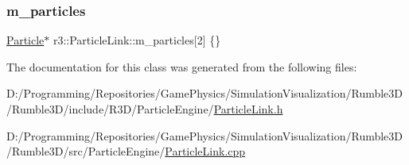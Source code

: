 \subsubsection{\texorpdfstring{m\+\_\+particles}{m\_particles}}
{\footnotesize\ttfamily \mbox{\hyperlink{classr3_1_1_particle}{Particle}}$\ast$ r3\+::\+Particle\+Link\+::m\+\_\+particles\mbox{[}2\mbox{]} \{\}\hspace{0.3cm}{\ttfamily [protected]}}



The documentation for this class was generated from the following files\+:\begin{DoxyCompactItemize}
\item 
D\+:/\+Programming/\+Repositories/\+Game\+Physics/\+Simulation\+Visualization/\+Rumble3\+D/\+Rumble3\+D/include/\+R3\+D/\+Particle\+Engine/\mbox{\hyperlink{_particle_link_8h}{Particle\+Link.\+h}}\item 
D\+:/\+Programming/\+Repositories/\+Game\+Physics/\+Simulation\+Visualization/\+Rumble3\+D/\+Rumble3\+D/src/\+Particle\+Engine/\mbox{\hyperlink{_particle_link_8cpp}{Particle\+Link.\+cpp}}\end{DoxyCompactItemize}
